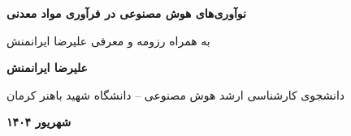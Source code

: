 \setlength{\parindent}{0pt}
\begin{titlepage}
    \vspace*{\fill}
    \centering
    {\fontsize{18}{19}\selectfont\bfseries نوآوری‌های هوش مصنوعی در فرآوری مواد معدنی\par}
    \vspace{0.5cm}
    {\fontsize{14}{15}\selectfont به همراه رزومه و معرفی علیرضا ایرانمنش \par}
    
    \vspace{1cm}
    
    {\fontsize{16}{17}\selectfont\bfseries علیرضا ایرانمنش\par}
    \vspace{0.3cm}
    {\fontsize{14}{15}\selectfont دانشجوی کارشناسی ارشد هوش مصنوعی – دانشگاه شهید باهنر کرمان \par}
    
    \vspace*{\fill}
    {\fontsize{14}{15}\selectfont\bfseries شهریور ۱۴۰۴ \par}
    \vspace*{\fill}
\end{titlepage}